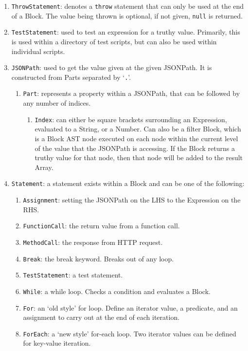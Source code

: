 \documentclass[]{full}
\theoremstyle{definition}
\begin{document}
\begin{enumerate}
    \item \verb|ThrowStatement|: denotes a \verb|throw| statement that can only be used at the end of a Block. The value being thrown is optional, if not given, \verb|null| is returned.
    \item \verb|TestStatement|: used to test an expression for a truthy value. Primarily, this is used within a directory of test scripts, but can also be used within individual scripts.
    \item \verb|JSONPath|: used to get the value given at the given JSONPath. It is constructed from Parts separated by `\verb|.|'.
    \begin{enumerate}
        \item \verb|Part|: represents a property within a JSONPath, that can be followed by any number of indices.
        \begin{enumerate}
            \item \verb|Index|: can either be square brackets surrounding an Expression, evaluated to a String, or a Number. Can also be a filter Block, which is a Block AST node executed on each node within the current level of the value that the JSONPath is accessing. If the Block returns a truthy value for that node, then that node will be added to the result Array.
        \end{enumerate}
    \end{enumerate}
    \item \verb|Statement|: a statement exists within a Block and can be one of the following:
    \begin{enumerate}
        \item \verb|Assignment|: setting the JSONPath on the LHS to the Expression on the RHS.
        \item \verb|FunctionCall|: the return value from a function call.
        \item \verb|MethodCall|: the response from HTTP request.
        \item \verb|Break|: the break keyword. Breaks out of any loop.
        \item \verb|TestStatement|: a test statement.
        \item \verb|While|: a while loop. Checks a condition and evaluates a Block.
        \item \verb|For|: an `old style' for loop. Define an iterator value, a predicate, and an assignment to carry out at the end of each iteration.
        \item \verb|ForEach|: a `new style' for-each loop. Two iterator values can be defined for key-value iteration.

\end{enumerate}
\end{enumerate}
\end{document}
